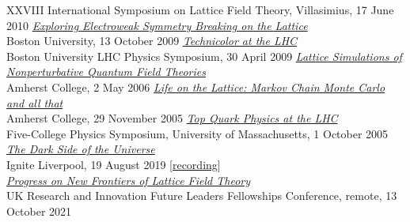 \begin{spacelist}
\begin{revnumerate}
      XXVIII International Symposium on Lattice Field Theory, Villasimius, 17 June 2010
    \pagebreakitem
      \textit{\href{http://www.davidschaich.net/talks/EWSB_lattice.pdf}{Exploring Electroweak Symmetry Breaking on the Lattice}} \\
      Boston University, 13 October 2009
    \pagebreakitem
      \textit{\href{http://www.davidschaich.net/talks/TC_LHC.pdf}{Technicolor at the LHC}} \\
      Boston University LHC Physics Symposium, 30 April 2009
    \pagebreakitem
      \textit{\href{http://www.davidschaich.net/talks/thesisDefense.pdf}{Lattice Simulations of Nonperturbative Quantum Field Theories}} \\
      Amherst College, 2 May 2006
    \pagebreakitem
      \textit{\href{http://www.davidschaich.net/talks/thesisTalk.pdf}{Life on the Lattice: Markov Chain Monte Carlo and all that}} \\
      Amherst College, 29 November 2005
    \pagebreakitem
      \textit{\href{http://www.davidschaich.net/talks/topMass.pdf}{Top Quark Physics at the LHC}} \\
      Five-College Physics Symposium, University of Massachusetts, 1 October 2005 \\
%
%
%
\vspace{18 pt}
\hspace{-22 pt}{\large \bfseries Public engagement} \vspace{-8 pt}
    \pagebreakitem
      \textit{\href{http://www.davidschaich.net/talks/1908Ignite.pdf}{The Dark Side of the Universe}} \\
      Ignite Liverpool, 19 August 2019 [\href{https://www.youtube.com/watch?v=KKOI831sB8U}{recording}] \\
%
%
%
\vspace{18 pt}
\hspace{-22 pt}{\large \bfseries Posters} \vspace{-8 pt}
    \pagebreakitem
      \textit{\href{http://www.davidschaich.net/talks/2110UKRI.pdf}{Progress on New Frontiers of Lattice Field Theory}} \\
      UK Research and Innovation Future Leaders Fellowships Conference, remote, 13 October 2021

\end{revnumerate}
\end{spacelist}
